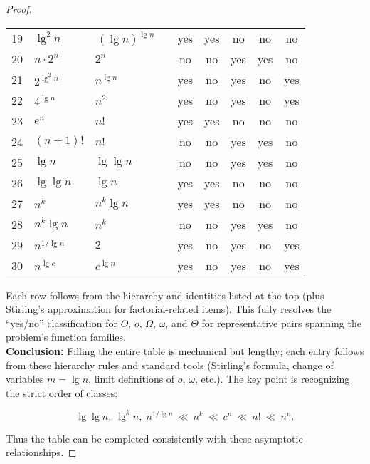 \documentclass[12pt]{article}
\theoremstyle{definition}
\begin{document}
\begin{proof}
\begin{tabular}{llllccccc}
19 & $\lg^2 n$           & \,$(\lg n)^{\lg n}$      & & yes & yes & no  & no  & no  \\
20 & $n\cdot 2^{n}$      & $2^{n}$                  & & no  & no  & yes & yes & no  \\
21 & $2^{\lg^2 n}$       & $n^{\lg n}$              & & yes & no  & yes & no  & yes \\
22 & $4^{\lg n}$         & $n^{2}$                  & & yes & no  & yes & no  & yes \\
23 & $e^{n}$             & $n!$                     & & yes & yes & no  & no  & no  \\
24 & $(n+1)!$            & $n!$                     & & no  & no  & yes & yes & no  \\
25 & $\lg n$             & $\lg\lg n$               & & no  & no  & yes & yes & no  \\
26 & $\lg\lg n$          & $\lg n$                  & & yes & yes & no  & no  & no  \\
27 & $n^{k}$             & $n^{k}\lg n$             & & yes & yes & no  & no  & no  \\
28 & $n^{k}\lg n$        & $n^{k}$                  & & no  & no  & yes & yes & no  \\
29 & $n^{1/\lg n}$       & $2$                      & & yes & no  & yes & no  & yes \\
30 & $n^{\lg c}$         & $c^{\lg n}$              & & yes & no  & yes & no  & yes \\
\bottomrule
\end{tabular}

\medskip
Each row follows from the hierarchy and identities listed at the top (plus Stirling’s approximation for factorial-related items). This fully resolves the “yes/no” classification for $O$, $o$, $\Omega$, $\omega$, and $\Theta$ for representative pairs spanning the problem’s function families.\\

\noindent
\textbf{Conclusion:}  
Filling the entire table is mechanical but lengthy; each entry follows from these hierarchy rules and standard tools (Stirling’s formula, change of variables $m=\lg n$, limit definitions of $o$, $\omega$, etc.). The key point is recognizing the strict order of classes:

\[
\lg\lg n,\;\lg^k n,\;n^{1/\lg n}\ \ll\ n^k\ \ll\ c^n\ \ll\ n!\ \ll\ n^n.
\]

Thus the table can be completed consistently with these asymptotic relationships.
\end{proof}
\end{document}
